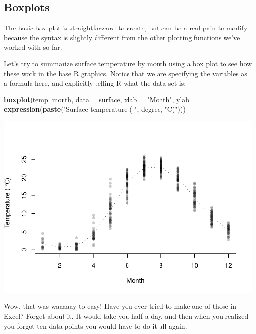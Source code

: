 \documentclass[
]{book}
\newenvironment{Shaded}{\begin{snugshade}}{\end{snugshade}}
\newcommand{\DataTypeTok}[1]{\textcolor[rgb]{0.13,0.29,0.53}{#1}}
\newcommand{\KeywordTok}[1]{\textcolor[rgb]{0.13,0.29,0.53}{\textbf{#1}}}
\newcommand{\NormalTok}[1]{#1}
\newcommand{\OperatorTok}[1]{\textcolor[rgb]{0.81,0.36,0.00}{\textbf{#1}}}
\newcommand{\StringTok}[1]{\textcolor[rgb]{0.31,0.60,0.02}{#1}}
\begin{document}
\hypertarget{boxplots}{%
\subsection{Boxplots}\label{boxplots}}

The basic box plot is straightforward to create, but can be a real pain to modify because the syntax is slightly different from the other plotting functions we've worked with so far.

Let's try to summarize surface temperature by month using a box plot to see how these work in the base R graphics. Notice that we are specifying the variables as a formula here, and explicitly telling R what the data set is:

\begin{Shaded}
\begin{Highlighting}[]
\KeywordTok{boxplot}\NormalTok{(temp}\OperatorTok{~}\NormalTok{month, }\DataTypeTok{data =}\NormalTok{ surface,}
        \DataTypeTok{xlab =} \StringTok{"Month"}\NormalTok{,}
        \DataTypeTok{ylab =} \KeywordTok{expression}\NormalTok{(}\KeywordTok{paste}\NormalTok{(}\StringTok{"Surface temperature ( "}\NormalTok{, degree, }\StringTok{"C)"}\NormalTok{)))}
\end{Highlighting}
\end{Shaded}

\includegraphics{worstr_files/figure-latex/unnamed-chunk-95-1.pdf}

Wow, that was waaaaay to easy! Have you ever tried to make one of those in Excel? Forget about it. It would take you half a day, and then when you realized you forgot ten data points you would have to do it all again.
\end{document}
